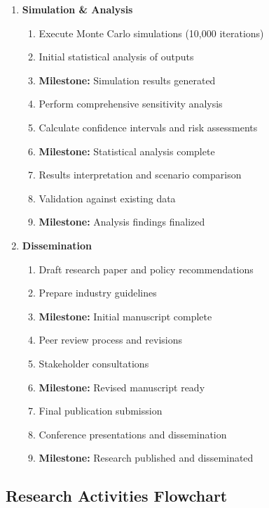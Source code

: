 \documentclass[a4paper, 12pt]{article}
\begin{document}
\begin{enumerate}
    \item \textbf{Simulation \& Analysis}
    \begin{enumerate}
        \item Execute Monte Carlo simulations (10,000 iterations)
        \item Initial statistical analysis of outputs
        \item \textbf{Milestone:} Simulation results generated
        \item Perform comprehensive sensitivity analysis
        \item Calculate confidence intervals and risk assessments
        \item \textbf{Milestone:} Statistical analysis complete
        \item Results interpretation and scenario comparison
        \item Validation against existing data
        \item \textbf{Milestone:} Analysis findings finalized
    \end{enumerate}
    
    \item \textbf{Dissemination}
    \begin{enumerate}
        \item Draft research paper and policy recommendations
        \item Prepare industry guidelines
        \item \textbf{Milestone:} Initial manuscript complete
        \item Peer review process and revisions
        \item Stakeholder consultations
        \item \textbf{Milestone:} Revised manuscript ready
        \item Final publication submission
        \item Conference presentations and dissemination
        \item \textbf{Milestone:} Research published and disseminated
    \end{enumerate}
\end{enumerate}

\subsection{Research Activities Flowchart}
\end{document}

